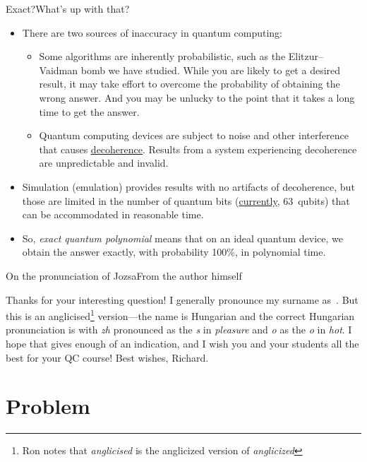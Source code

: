 \begin{frame}{Exact?}{What's up with that?}
\begin{itemize}[<+->]
    \item There are two sources of inaccuracy in quantum computing:
    \begin{itemize}
        \item Some algorithms are inherently probabilistic, such as the Elitzur--Vaidman bomb we have studied. While you are likely to get a desired result, it may take effort to overcome the probability of obtaining the wrong answer.  And you may be unlucky to the point that it takes a long time to get the answer.
        \item Quantum computing devices are subject to noise and other interference that causes \href{https://en.wikipedia.org/wiki/Quantum_decoherence}{decoherence}.  Results from a system experiencing decoherence are unpredictable and invalid.
    \end{itemize}
    \item Simulation (emulation) provides results with no artifacts of decoherence, but those are limited in the number of quantum bits (\href{https://qiskit.org/documentation/tutorials/simulators/6_extended_stabilizer_tutorial.html}{currently}, 63~qubits) that can be accommodated in reasonable time.
    \item So, \emph{exact quantum polynomial} means that on an ideal quantum device, we obtain the answer exactly, with probability 100\%, in polynomial time.
\end{itemize}
\end{frame}

\begin{frame}{On the pronunciation of Jozsa}{From the author himself}

Thanks for your interesting question!  I generally pronounce my surname as~.
\SmallSkip{}
But this is an anglicised\footnote{%
Ron notes that \emph{anglici\alert{s}ed} is the anglicized version of \emph{anglici\alert{z}ed}}
version---the name is Hungarian and the correct Hungarian pronunciation is   with \emph{zh} pronounced as the \emph{s} in \emph{pleasure} and \emph{o} as the \emph{o} in \emph{hot}.
\SmallSkip{}
I hope that gives enough of an indication, and I wish you and your students all the best for your QC course!
\BigSkip{}
Best wishes,  Richard.
\end{frame}

\section*{Problem}

